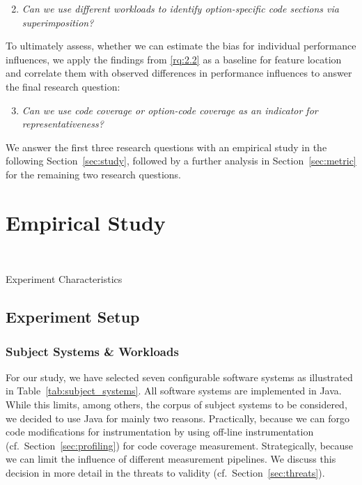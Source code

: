 \begin{enumerate}[align=left,label=RQ2.\arabic*]
	\setcounter{enumi}{1}
	\item\textit{Can we use different workloads to identify option-specific code sections via superimposition?}\label{rq:2.2}
\end{enumerate}

To ultimately assess, whether we can estimate the bias for individual performance influences, we apply the findings from \ref{rq:2.2} as a baseline for feature location and correlate them with observed differences in performance influences to answer the final research question:

\begin{enumerate}[align=left,label=RQ2.\arabic*]
	\setcounter{enumi}{2}
	\item\textit{Can we use code coverage or option-code coverage as an indicator for representativeness?}\label{rq:2.3}
\end{enumerate}

We answer the first three research questions with an empirical study in the following Section~\ref{sec:study}, followed by a further analysis in Section~\ref{sec:metric} for the remaining two research questions.

\section{Empirical Study}~\label{sec:study}
\begin{table*}[ht!]
	\centering
	\caption{Experiment Characteristics}
	
	\label{tab:subject_systems}
\end{table*}
\subsection{Experiment Setup}
\subsubsection{Subject Systems \& Workloads}

For our study, we have selected seven configurable software systems as illustrated in Table~\ref{tab:subject_systems}. All software systems are implemented in Java. While this limits, among others, the corpus of subject systems to be considered, we decided to use Java for mainly two reasons. Practically, because we can forgo code modifications for instrumentation by using off-line instrumentation (cf.~Section~\ref{sec:profiling}) for code coverage measurement. Strategically, because we can limit the influence of different measurement pipelines. We discuss this decision in more detail in the threats to validity (cf.~Section~\ref{sec:threats}).

